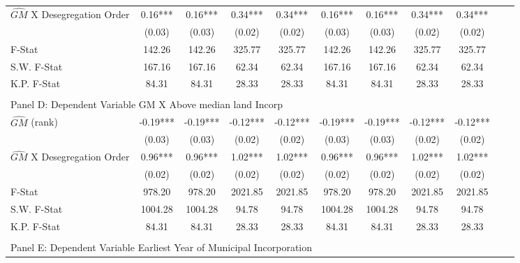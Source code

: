 \begin{table}[htbp]
\begin{threeparttable}
\begin{tabular}{l*{10}{c}}
\addlinespace
$\hat{GM}$ X Desegregation Order&       0.16***&       0.16***&       0.34***&       0.34***&       0.16***&       0.16***&       0.34***&       0.34***\\
                &     (0.03)   &     (0.03)   &     (0.02)   &     (0.02)   &     (0.03)   &     (0.03)   &     (0.02)   &     (0.02)   \\
\midrule
F-Stat          &     142.26   &     142.26   &     325.77   &     325.77   &     142.26   &     142.26   &     325.77   &     325.77   \\
S.W. F-Stat     &     167.16   &     167.16   &      62.34   &      62.34   &     167.16   &     167.16   &      62.34   &      62.34   \\
K.P. F-Stat     &      84.31   &      84.31   &      28.33   &      28.33   &      84.31   &      84.31   &      28.33   &      28.33   \\
\cmidrule[\heavyrulewidth](lr){1-9} \\ \cmidrule[\heavyrulewidth](lr){1-9}
\multicolumn{8}{l}{Panel D: Dependent Variable GM X Above median land Incorp}\\
\cmidrule(lr){1-9}
$\hat{GM}$ (rank)&      -0.19***&      -0.19***&      -0.12***&      -0.12***&      -0.19***&      -0.19***&      -0.12***&      -0.12***\\
                &     (0.03)   &     (0.03)   &     (0.02)   &     (0.02)   &     (0.03)   &     (0.03)   &     (0.02)   &     (0.02)   \\
\addlinespace
$\hat{GM}$ X Desegregation Order&       0.96***&       0.96***&       1.02***&       1.02***&       0.96***&       0.96***&       1.02***&       1.02***\\
                &     (0.02)   &     (0.02)   &     (0.02)   &     (0.02)   &     (0.02)   &     (0.02)   &     (0.02)   &     (0.02)   \\
\midrule
F-Stat          &     978.20   &     978.20   &    2021.85   &    2021.85   &     978.20   &     978.20   &    2021.85   &    2021.85   \\
S.W. F-Stat     &    1004.28   &    1004.28   &      94.78   &      94.78   &    1004.28   &    1004.28   &      94.78   &      94.78   \\
K.P. F-Stat     &      84.31   &      84.31   &      28.33   &      28.33   &      84.31   &      84.31   &      28.33   &      28.33   \\
\cmidrule[\heavyrulewidth](lr){1-9} \\ \cmidrule[\heavyrulewidth](lr){1-9}
\multicolumn{8}{l}{Panel E: Dependent Variable Earliest Year of Municipal Incorporation}\\

\end{tabular}
\end{threeparttable}
\end{table}
